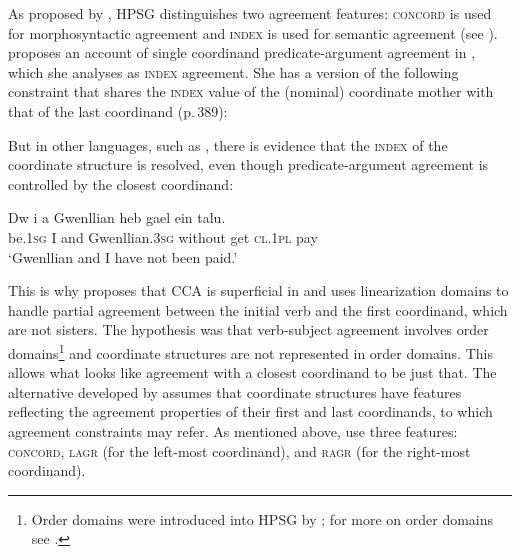 As proposed by \citet[Chapter~2]{wechsler}, HPSG distinguishes two agreement features: \textsc{concord} is used for
morphosyntactic agreement and \textsc{index} is used for semantic agreement (see
). \citet{Moosally} proposes an account
of single coordinand predicate-argument agreement in , which she analyses as  \textsc{index} agreement. She has  a version of the following 
constraint that shares the \textsc{index} value of the (nominal) coordinate mother with that of the
last coordinand (p.\,389):

\ea
{}
\z


But in other languages, such as , there is evidence that the \textsc{index} of the coordinate
structure is resolved, even though predicate-argument agreement is controlled by the closest coordinand: 

\ea 
\gll Dw              i a   Gwenllian              heb     gael ein                      talu.\footnotemark\\
     be.1\textsc{sg} I and Gwenllian.3\textsc{sg} without get  \textsc{cl}.1\textsc{pl} pay \\
\glt  `Gwenllian and I have not been paid.'
\z

\noindent
This is why \citet{Borsley:2009} proposes that CCA is superficial in  and uses linearization domains\label{page-linearization-domains-in-coordination-one} to handle partial agreement between the initial verb and the first coordinand, which are not sisters.
The hypothesis  was that verb-subject agreement involves order domains\footnote{
  Order domains were introduced into HPSG by \citet{Reape94a}; for more on order domains see
  .
} and coordinate structures are not represented in order domains. This allows what looks like agreement with a closest coordinand to be just that. The alternative developed by \citet{Villavicencio:Sadler:ea:05} assumes that coordinate structures have features reflecting the agreement properties of their first and last coordinands, to which agreement constraints may refer. 
As mentioned above, \citet{Villavicencio:Sadler:ea:05} use three features: \textsc{concord}, 
\textsc{lagr} (for the left-most coordinand), and 
\textsc{ragr} (for the right-most coordinand). 

